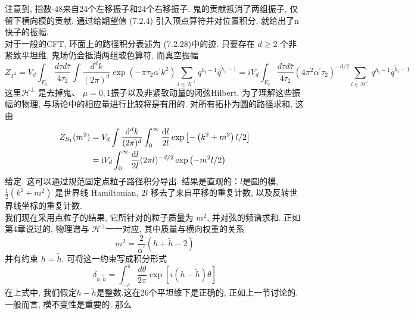 注意到, 指数-48来自24个左移振子和24个右移振子. 鬼的贡献抵消了两组振子, 仅留下横向模的贡献. 通过给期望值  (7.2.4) 引入顶点算符并对位置积分, 就给出了n快子的振幅. \\
对于一般的CFT, 环面上的路径积分表述为 (7.2.28)中的迹. 只要存在 $d \geq 2$ 个非紧致平坦维, 鬼场仍会抵消两组玻色算符, 而真空振幅
\begin{subequations}
\begin{equation}
Z_{T^{2}} =V_{d} \int_{F_{0}} \frac{d \tau d \bar{\tau}}{4 \tau_{2}} \int \frac{d^{d} k}{(2 \pi)^{d}} \exp \left(-\pi \tau_{2} \alpha^{\prime} k^{2}\right) \sum_{i \in \mathscr{H}^{\perp}} q^{h_{i}-1} \bar{q}^{\tilde{h}_{i}-1} 
\end{equation}
\begin{equation}
=i V_{d} \int_{F_{0}} \frac{d \tau d \bar{\tau}}{4 \tau_{2}}\left(4 \pi^{2} \alpha^{\prime} \tau_{2}\right)^{-d / 2} \sum_{i \in \mathscr{H}^{\perp}} q^{h_{i}-1} \bar{q}^{\tilde{h}_{i}-1}
\end{equation}		
\end{subequations}
这里$\mathscr{H}^{\perp}$ 是去掉鬼、 $\mu=0,1$振子以及非紧致动量的闭弦Hilbert. 为了理解这些振幅的物理, 与场论中的相应量进行比较将是有用的. 对所有拓扑为圆的路径求和, 这由
	\begin{align}
		Z_{S_{1}}(m^{2}) &=V_{d} \int \frac{\mathrm{d}^{d} k}{(2 \pi)^{d}} \int_{0}^{\infty} \frac{\mathrm{d} l}{2 l} \exp \left[-\left(k^{2}+m^{2}\right) l / 2\right] \nonumber \\
		&=\mathrm{i} V_{d} \int_{0}^{\infty} \frac{\mathrm{d} l}{2 l}(2 \pi l)^{-d / 2} \exp \left(-m^{2} l / 2\right) \label{7.3.9}
	\end{align}
给定. 这可以通过规范固定点粒子路径积分导出. 结果是直观的：$l$是圆的模,  $\frac{1}{2}\left(k^{2}+m^{2}\right)$ 是世界线 Hamiltonian, $2 l$ 移去了来自平移的重复计数, 以及反转世界线坐标的重复计数.\\
我们现在采用点粒子的结果, 它所针对的粒子质量为 $m^{2}$, 并对弦的频谱求和. 正如第4章说过的, 物理谱与 $\mathscr{H}^{\perp}$一一对应, 其中质量与横向权重的关系
\begin{equation}
	m^{2}=\frac{2}{\alpha^{\prime}}(h+\tilde{h}-2)
\end{equation}
并有约束 $h=\tilde{h} $. 可将这一约束写成积分形式
\begin{equation}
	\delta_{h, \tilde{h}}=\int_{-\pi}^{\pi} \frac{d \theta}{2 \pi} \exp [i(h-\tilde{h}) \theta]
\end{equation}
在上式中, 我们假定$h-\tilde{h}$是整数.这在26个平坦维下是正确的, 正如上一节讨论的. 一般而言, 模不变性是重要的. 那么
